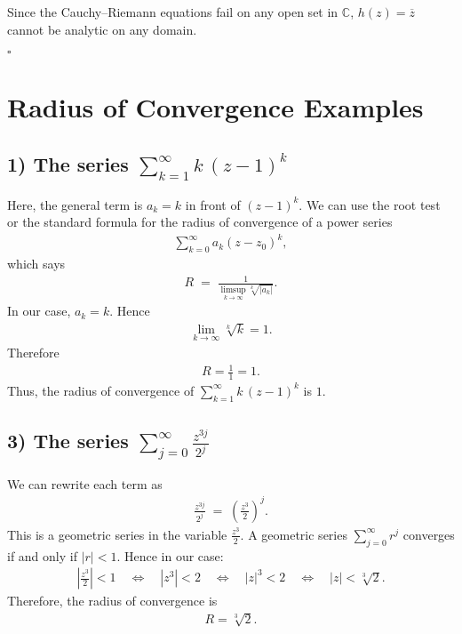 \documentclass[12pt]{article}
\theoremstyle{definition} %
\theoremstyle{plain} %
\begin{document}
Since the Cauchy--Riemann equations fail on any open set in $\mathbb{C}$, $h(z)=\overline{z}$ cannot be analytic on any domain. 

\quad $\square$

\section*{Radius of Convergence Examples}

\subsection*{1) The series \(\displaystyle \sum_{k=1}^{\infty} k\,(z-1)^k\)}

Here, the general term is \(a_k = k\) in front of \((z-1)^k\).  We can use the root test or the standard formula for the radius of convergence of a power series
\begin{align}
\sum_{k=0}^{\infty} a_k (z-z_0)^k,
\end{align}
which says 
\begin{align}
R 
\;=\; 
\frac{1}{\displaystyle \limsup_{k \to \infty} \sqrt[k]{|a_k|}}.
\end{align}
In our case, \(a_k = k\). Hence
\begin{align}
\lim_{k \to \infty} \sqrt[k]{k} = 1.
\end{align}
Therefore 
\begin{align}
R = \frac{1}{1} = 1.
\end{align}
Thus, the radius of convergence of \(\sum_{k=1}^\infty k\,(z-1)^k\) is \(1\).

\subsection*{3) The series \(\displaystyle \sum_{j=0}^{\infty}\frac{z^{3j}}{2^j}\)}

We can rewrite each term as
\begin{align}
\frac{z^{3j}}{2^j}
\;=\;
\left(\frac{z^3}{2}\right)^j.
\end{align}
This is a geometric series in the variable \(\tfrac{z^3}{2}\).  A geometric series 
\(\sum_{j=0}^\infty r^j\) converges if and only if \(|r| < 1\).  Hence in our case:
\begin{align}
\left|\frac{z^3}{2}\right| < 1
\quad\Longleftrightarrow\quad
|z^3| < 2
\quad\Longleftrightarrow\quad
|z|^3 < 2
\quad\Longleftrightarrow\quad
|z| < \sqrt[3]{2}.
\end{align}
Therefore, the radius of convergence is 
\begin{align}
R = \sqrt[3]{2}.
\end{align}
\end{document}
